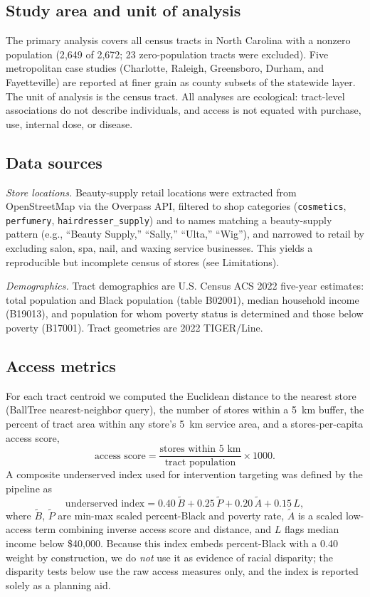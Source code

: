 \documentclass[12pt,letterpaper]{article}
\begin{document}
\subsection{Study area and unit of analysis}

The primary analysis covers all census tracts in North Carolina with a
nonzero population (2{,}649 of 2{,}672; 23 zero-population tracts were excluded).
Five metropolitan case studies (Charlotte, Raleigh, Greensboro, Durham, and
Fayetteville) are reported at finer grain as county subsets of the statewide
layer. The unit of analysis is the census tract. All analyses are ecological:
tract-level associations do not describe individuals, and access is not equated
with purchase, use, internal dose, or disease.

\subsection{Data sources}

\emph{Store locations.} Beauty-supply retail locations were extracted from
OpenStreetMap via the Overpass API, filtered to shop categories
(\texttt{cosmetics}, \texttt{perfumery}, \texttt{hairdresser\_supply}) and to
names matching a beauty-supply pattern (e.g., ``Beauty Supply,'' ``Sally,''
``Ulta,'' ``Wig''), and narrowed to retail by excluding salon, spa, nail, and
waxing service businesses. This yields a reproducible but incomplete census of
stores (see Limitations).

\emph{Demographics.} Tract demographics are U.S. Census ACS 2022 five-year
estimates: total population and Black population (table B02001), median
household income (B19013), and population for whom poverty status is determined
and those below poverty (B17001). Tract geometries are 2022 TIGER/Line.

\subsection{Access metrics}

For each tract centroid we computed the Euclidean distance to the nearest store
(BallTree nearest-neighbor query), the number of stores within a 5~km buffer,
the percent of tract area within any store's 5~km service area, and a
stores-per-capita access score,
\begin{equation}
\text{access score} = \frac{\text{stores within 5 km}}{\text{tract population}}\times 1000 .
\end{equation}
A composite underserved index used for intervention targeting was defined by the
pipeline as
\begin{equation}
\text{underserved index} = 0.40\,\widetilde{B} + 0.25\,\widetilde{P}
 + 0.20\,\widetilde{A} + 0.15\,L,
\end{equation}
where $\widetilde{B}$, $\widetilde{P}$ are min-max scaled percent-Black and
poverty rate, $\widetilde{A}$ is a scaled low-access term combining inverse
access score and distance, and $L$ flags median income below \$40{,}000. Because
this index embeds percent-Black with a 0.40 weight by construction, we do
\emph{not} use it as evidence of racial disparity; the disparity tests below use
the raw access measures only, and the index is reported solely as a planning
aid.
\end{document}
